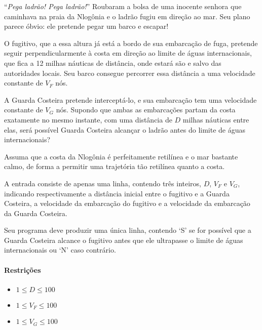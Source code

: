 %
%
%

``\emph{Pega ladrão! Pega ladrão!}'' Roubaram a bolsa de uma inocente senhora que caminhava na praia da Nlogônia e o ladrão fugiu em direção ao mar. Seu plano parece óbvio: ele pretende pegar um barco e escapar!

O fugitivo, que a essa altura já está a bordo de sua embarcação de fuga, pretende seguir perpendicularmente à costa em direção ao limite de águas internacionais, que fica a 12 milhas náuticas de distância, onde estará são e salvo das autoridades locais. Seu barco consegue percorrer essa distância a uma velocidade constante de $V_F$ nós.

A Guarda Costeira pretende interceptá-lo, e sua embarcação tem uma velocidade constante de $V_G$ nós. Supondo que ambas as embarcações partam da costa exatamente no mesmo instante, com uma distância de $D$ milhas náuticas entre elas, será possível Guarda Costeira alcançar o ladrão antes do limite de águas internacionais?

Assuma que a costa da Nlogônia é perfeitamente retilínea e o mar bastante calmo, de forma a permitir uma trajetória tão retilínea quanto a costa.

\Entrada%
A entrada consiste de apenas uma linha, contendo três inteiros, $D$, $V_F$ e $V_G$, indicando respectivamente a distância inicial entre o fugitivo e a Guarda Costeira, a velocidade da embarcação do fugitivo e a velocidade da embarcação da Guarda Costeira.

\Saida%
Seu programa deve produzir uma única linha, contendo ‘S’ se for possível que a Guarda Costeira alcance o fugitivo antes que ele ultrapasse o limite de águas internacionais ou `N' caso contrário.

\paragraph{Restrições}%
\begin{itemize}
	\item $1 \leq D \leq 100$
	\item $1 \leq V_F \leq 100$
	\item $1 \leq V_G \leq 100$
\end{itemize}

%
